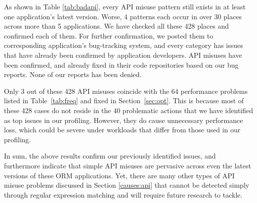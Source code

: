 As shown in Table \ref{tab:badapi}, 
every API misuse pattern still exists in at least one application's latest version. Worse, 4 patterns each occur in over 30 places across more than 5 applications. 
We have checked all these 428 places and confirmed each of them. For further confirmation, we posted them to corresponding application's bug-tracking system, and every category has issues that have already been confirmed by application developers.
\numconfirmedapi API misuses have been confirmed, and \numfixedapi already fixed in their code repositories based on our bug reports. None of our reports has been denied. %

Only 3 out of these 428 API misuses coincide with the 64 performance problems listed in Table~\ref{tab:freq} and fixed in Section~\ref{sec:opt}. This is because most of these 428 cases do not reside in the 40 problematic actions that we have identified as top issues in our profiling. However, they do cause unnecessary performance loss, which could be severe under workloads that differ from those used in our profiling.

In sum, the above results confirm our previously identified issues, and furthermore indicate that simple API misuses are pervasive across even the latest versions of these ORM applications.
Yet, there are many other types of API misuse problems discussed in Section \ref{causes:api} that cannot be detected simply
through regular expression matching and will require future research to tackle.

